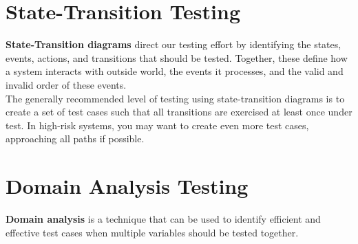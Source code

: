 \documentclass{article}
\begin{document}
\section*{State-Transition Testing}
\textbf{State-Transition diagrams} direct our testing effort by identifying the states, events, actions, and transitions that should be tested. Together, these define how a system interacts with outside world, the events it processes, and the valid and invalid order of these events.
\\
The generally recommended level of testing using state-transition diagrams is to create a set of test cases such that all transitions are exercised at least once under test. In high-risk systems, you may want to create even more test cases, approaching all paths if possible.

\section*{Domain Analysis Testing}
\textbf{Domain analysis} is a technique that can be used to identify efficient and effective test cases when multiple variables should be tested together.
\end{document}
